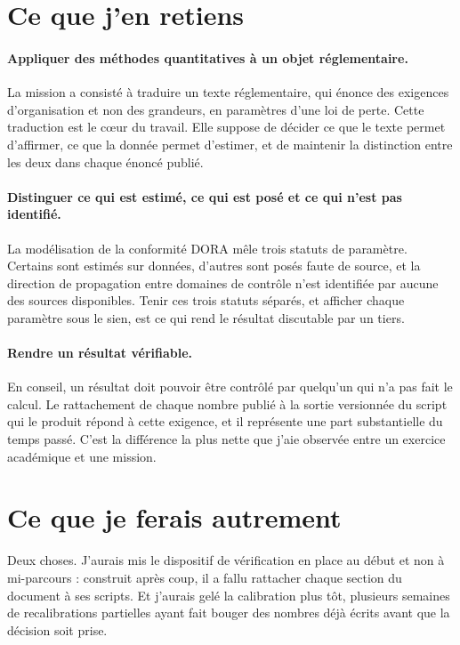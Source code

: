 \section{Ce que j'en retiens}
\label{ens:retiens}

\paragraph{Appliquer des méthodes quantitatives à un objet réglementaire.} La
mission a consisté à traduire un texte réglementaire, qui énonce des exigences
d'organisation et non des grandeurs, en paramètres d'une loi de perte. Cette
traduction est le cœur du travail. Elle suppose de décider ce que le texte permet
d'affirmer, ce que la donnée permet d'estimer, et de maintenir la distinction entre
les deux dans chaque énoncé publié.

\paragraph{Distinguer ce qui est estimé, ce qui est posé et ce qui n'est pas
identifié.} La modélisation de la conformité DORA mêle trois statuts de
paramètre. Certains sont estimés sur données, d'autres sont posés faute de source, et
la direction de propagation entre domaines de contrôle n'est identifiée par aucune
des sources disponibles. Tenir ces trois statuts séparés, et afficher chaque
paramètre sous le sien, est ce qui rend le résultat discutable par un tiers.

\paragraph{Rendre un résultat vérifiable.} En conseil, un résultat doit pouvoir être
contrôlé par quelqu'un qui n'a pas fait le calcul. Le rattachement de chaque nombre
publié à la sortie versionnée du script qui le produit répond à cette exigence, et il
représente une part substantielle du temps passé. C'est la différence la plus nette
que j'aie observée entre un exercice académique et une mission.

\section{Ce que je ferais autrement}
\label{ens:autrement}

Deux choses. J'aurais mis le dispositif de vérification en place au début et non à
mi-parcours : construit après coup, il a fallu rattacher chaque section du document à
ses scripts. Et j'aurais gelé la calibration plus tôt, plusieurs semaines de
recalibrations partielles ayant fait bouger des nombres déjà écrits avant que la
décision soit prise.
